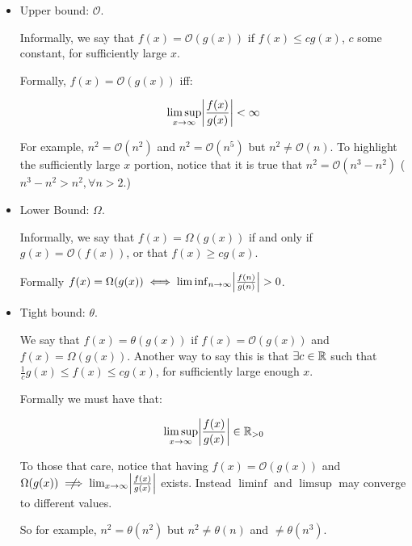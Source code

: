 \begin{itemize}

\item Upper bound: $\mathcal{O}$.

\begin{definition*}
Informally, we say that $f(x) = \mathcal{O}(g(x))$ if $ f(x) \leq cg(x)$, $c$
some constant, for sufficiently large $x$. 

Formally, $f(x) = \mathcal{O}(g(x))$ iff:

$$
\limsup_{x \to \infty} \abs{\frac{f(x)}{g(x)}} < \infty
$$

For example, $n^2 = \mathcal{O}(n^2)$ and $n^2 = \mathcal{O}(n^5)$ but $n^2 \neq
\mathcal{O}(n)$. To highlight the sufficiently large $x$ portion, notice that it
is true that $n^2 = \mathcal{O}(n^3 - n^2)$ ($n^3 - n^2 > n^2, \forall n > 2$.)

\end{definition*}

\item Lower Bound: $\Omega$.

\begin{definition*}

Informally, we say that $f(x) = \Omega(g(x))$ if and only if $g(x) =
\mathcal{O}(f(x))$, or that $f(x) \geq cg(x)$.

Formally $f(x) = \Omega(g(x)) \iff \liminf_{n \to \infty}
\abs{\frac{f(n)}{g(n)}} > 0$.

\end{definition*}

\item Tight bound: $\theta$.

\begin{definition*}

We say that $f(x) = \theta(g(x))$ if $f(x) = \mathcal{O}(g(x))$ and $f(x) =
\Omega(g(x))$. Another way to say this is that $\exists c \in \mathbb{R}$ such that
$\frac{1}{c} g(x) \leq f(x) \leq cg(x)$, for sufficiently large enough $x$.

Formally we must have that:

$$
\limsup_{x \to \infty} \abs{\frac{f(x)}{g(x)}} \in \mathbb{R}_{> 0}
$$

To those that care, notice that having $f(x) = \mathcal{O}(g(x))$ and
$\Omega(g(x)) \centernot \implies \lim_{x \to \infty} \abs{\frac{f(x)}{g(x)}}$ exists.
Instead $\liminf$ and $\limsup$ may converge to different values.

So for example, $n^2 = \theta(n^2)$ but $n^2 \neq \theta(n)$ and $\neq
\theta(n^3)$.

\end{definition*}

\end{itemize}

